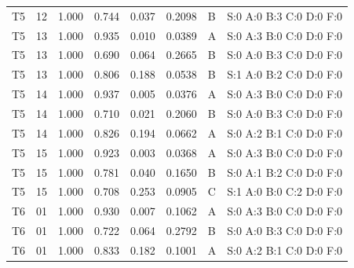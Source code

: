 \begin{longtable}{lrrrrrll}
T5 & 12 & 1.000 & 0.744 & 0.037 & 0.2098 & B & \tiny S:0 A:0 B:3 C:0 D:0 F:0 \\
T5 & 13 & 1.000 & 0.935 & 0.010 & 0.0389 & A & \tiny S:0 A:3 B:0 C:0 D:0 F:0 \\
T5 & 13 & 1.000 & 0.690 & 0.064 & 0.2665 & B & \tiny S:0 A:0 B:3 C:0 D:0 F:0 \\
T5 & 13 & 1.000 & 0.806 & 0.188 & 0.0538 & B & \tiny S:1 A:0 B:2 C:0 D:0 F:0 \\
T5 & 14 & 1.000 & 0.937 & 0.005 & 0.0376 & A & \tiny S:0 A:3 B:0 C:0 D:0 F:0 \\
T5 & 14 & 1.000 & 0.710 & 0.021 & 0.2060 & B & \tiny S:0 A:0 B:3 C:0 D:0 F:0 \\
T5 & 14 & 1.000 & 0.826 & 0.194 & 0.0662 & A & \tiny S:0 A:2 B:1 C:0 D:0 F:0 \\
T5 & 15 & 1.000 & 0.923 & 0.003 & 0.0368 & A & \tiny S:0 A:3 B:0 C:0 D:0 F:0 \\
T5 & 15 & 1.000 & 0.781 & 0.040 & 0.1650 & B & \tiny S:0 A:1 B:2 C:0 D:0 F:0 \\
T5 & 15 & 1.000 & 0.708 & 0.253 & 0.0905 & C & \tiny S:1 A:0 B:0 C:2 D:0 F:0 \\
T6 & 01 & 1.000 & 0.930 & 0.007 & 0.1062 & A & \tiny S:0 A:3 B:0 C:0 D:0 F:0 \\
T6 & 01 & 1.000 & 0.722 & 0.064 & 0.2792 & B & \tiny S:0 A:0 B:3 C:0 D:0 F:0 \\
T6 & 01 & 1.000 & 0.833 & 0.182 & 0.1001 & A & \tiny S:0 A:2 B:1 C:0 D:0 F:0 \\
\end{longtable}
